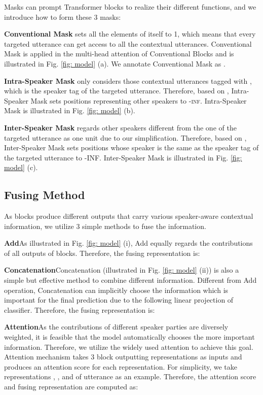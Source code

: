 \documentclass[letterpaper]{article} \usepackage{aaai21}  \usepackage{times}  \usepackage{helvet} \usepackage{courier}  \usepackage[hyphens]{url}  \usepackage{graphicx} \urlstyle{rm} \def\UrlFont{\rm}  \usepackage{natbib}  \usepackage{caption} \usepackage{multirow}
\begin{document}
Masks can prompt Transformer blocks to realize their different functions, and we introduce how to form these 3 masks: 

\textbf{Conventional Mask} sets all the elements of itself to 1, which means that every targeted utterance can get access to all the contextual utterances. Conventional Mask is applied in the multi-head attention of Conventional Blocks and is illustrated in Fig. \ref{fig: model} (a). We annotate Conventional Mask as . 

\textbf{Intra-Speaker Mask} only considers those contextual utterances tagged with , which is the speaker tag of the targeted utterance. Therefore, based on , Intra-Speaker Mask  sets positions representing other speakers to \textsc{-inf}. Intra-Speaker Mask is illustrated in Fig. \ref{fig: model} (b). 

\textbf{Inter-Speaker Mask} regards other speakers different from the one of the targeted utterance as one unit due to our simplification. Therefore, based on , Inter-Speaker Mask  sets positions whose speaker is the same as the speaker tag of the targeted utterance to \textsc{-INF}. Inter-Speaker Mask is illustrated in Fig. \ref{fig: model} (c). 

\subsection{Fusing Method}
As blocks produce different outputs that carry various speaker-aware contextual information, we utilize 3 simple methods to fuse the information. 

\textbf{Add}\quad As illustrated in Fig. \ref{fig: model} (i), Add equally regards the contributions of all outputs of blocks. Therefore, the fusing representation is: 


\textbf{Concatenation}\quad Concatenation (illustrated in Fig. \ref{fig: model} (ii)) is also a simple but effective method to combine different information. Different from Add operation, Concatenation can implicitly choose the information which is important for the final prediction due to the following linear projection of classifier. Therefore, the fusing representation  is:


\textbf{Attention}\quad As the contributions of different speaker parties are diversely weighted, it is feasible that the model automatically chooses the more important information. Therefore, we utilize the widely used attention \citep{Fusion} to achieve this goal. Attention mechanism takes 3 block outputting representations as inputs and produces an attention score for each representation. For simplicity, we take representations , , and  of utterance  as an example. Therefore, the attention score and fusing representation are computed as:
\end{document}
